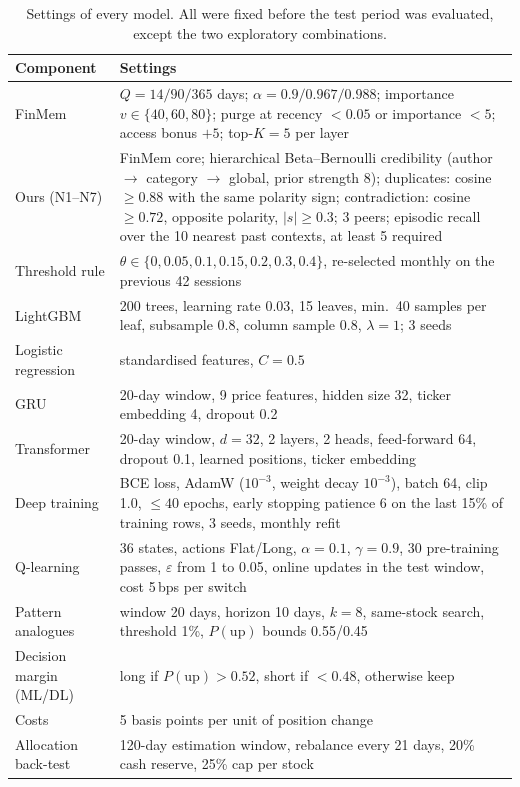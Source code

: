 \begin{table}[H]
\centering
\small
\caption{Settings of every model. All were fixed before the test period was evaluated, except the two exploratory combinations.}
\label{tab:hyper}
\begin{tabular}{p{}p{}}
\toprule
Component & Settings \\
\midrule
FinMem & $Q=14/90/365$ days; $\alpha=0.9/0.967/0.988$; importance $v\in\{40,60,80\}$; purge at recency $<0.05$ or importance $<5$; access bonus $+5$; top-$K=5$ per layer \\
Ours (N1--N7) & FinMem core; hierarchical Beta--Bernoulli credibility (author $\rightarrow$ category $\rightarrow$ global, prior strength 8); duplicates: cosine $\ge0.88$ with the same polarity sign; contradiction: cosine $\ge0.72$, opposite polarity, $|s|\ge0.3$; 3 peers; episodic recall over the 10 nearest past contexts, at least 5 required \\
Threshold rule & $\theta\in\{0,0.05,0.1,0.15,0.2,0.3,0.4\}$, re-selected monthly on the previous 42 sessions \\
LightGBM & 200 trees, learning rate 0.03, 15 leaves, min.\ 40 samples per leaf, subsample 0.8, column sample 0.8, $\lambda=1$; 3 seeds \\
Logistic regression & standardised features, $C=0.5$ \\
GRU & 20-day window, 9 price features, hidden size 32, ticker embedding 4, dropout 0.2 \\
Transformer & 20-day window, $d=32$, 2 layers, 2 heads, feed-forward 64, dropout 0.1, learned positions, ticker embedding \\
Deep training & BCE loss, AdamW ($10^{-3}$, weight decay $10^{-3}$), batch 64, clip 1.0, $\le40$ epochs, early stopping patience 6 on the last 15\% of training rows, 3 seeds, monthly refit \\
Q-learning & 36 states, actions Flat/Long, $\alpha=0.1$, $\gamma=0.9$, 30 pre-training passes, $\varepsilon$ from 1 to 0.05, online updates in the test window, cost 5\,bps per switch \\
Pattern analogues & window 20 days, horizon 10 days, $k=8$, same-stock search, threshold 1\%, $P(\text{up})$ bounds 0.55/0.45 \\
Decision margin (ML/DL) & long if $P(\text{up})>0.52$, short if $<0.48$, otherwise keep \\
Costs & 5 basis points per unit of position change \\
Allocation back-test & 120-day estimation window, rebalance every 21 days, 20\% cash reserve, 25\% cap per stock \\
\bottomrule
\end{tabular}
\end{table}

